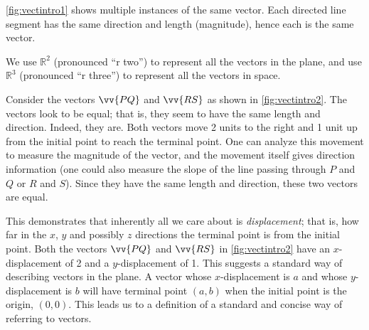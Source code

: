 \autoref{fig:vectintro1} shows multiple instances of the same vector. Each directed line segment has the same direction and length (magnitude), hence each is the same vector.


We use $\mathbb{R}^2$ (pronounced ``r two'') to represent all the vectors in the plane, and use $\mathbb{R}^3$ (pronounced ``r three'') to represent all the vectors in space.


Consider the vectors $\vv{PQ}$ and $\vv{RS}$ as shown in \autoref{fig:vectintro2}. The vectors look to be equal; that is, they seem to have the same length and direction. Indeed, they are. Both vectors move 2 units to the right and 1 unit up from the initial point to reach the terminal point. One can analyze this movement to measure the magnitude of the vector, and the movement itself gives direction information (one could also measure the slope of the line passing through $P$ and $Q$ or $R$ and $S$). Since they have the same length and direction, these two vectors are equal.

This demonstrates that inherently all we care about is \textit{displacement}; that is, how far in the $x$, $y$ and possibly $z$ directions the terminal point is from the initial point. Both the vectors $\vv{PQ}$ and $\vv{RS}$ in \autoref{fig:vectintro2} have an $x$-displacement of 2 and a $y$-displacement of 1. This suggests a standard way of describing vectors in the plane. A vector whose $x$-displacement is $a$ and whose $y$-displacement is $b$ will have terminal point $(a,b)$ when the initial point is the origin, $(0,0)$. This leads us to a definition of a standard and concise way of referring to vectors.

